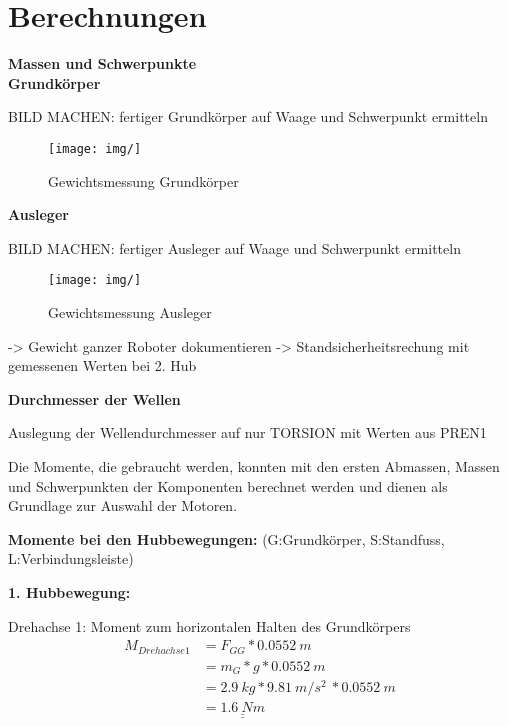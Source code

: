 \section{Berechnungen}

\textbf{Massen und Schwerpunkte}\\

\textbf{Grundkörper}

BILD MACHEN: fertiger Grundkörper auf Waage und Schwerpunkt ermitteln

\begin{figure}[H]
  \texttt{[image: img/]}
  \centering
  \caption{Gewichtsmessung Grundkörper}
\end{figure}

\newpage

\textbf{Ausleger}

BILD MACHEN: fertiger Ausleger auf Waage und Schwerpunkt ermitteln


\begin{figure}[H]
  \texttt{[image: img/]}
  \centering
  \caption{Gewichtsmessung Ausleger}
\end{figure}

-> Gewicht ganzer Roboter dokumentieren
-> Standsicherheitsrechung mit gemessenen Werten bei 2. Hub

\newpage

\textbf{Durchmesser der Wellen}

Auslegung der Wellendurchmesser auf nur TORSION mit Werten aus PREN1








Die Momente, die gebraucht werden, konnten mit den ersten Abmassen, Massen und Schwerpunkten der Komponenten berechnet werden und dienen als Grundlage zur Auswahl der Motoren.

\textbf{Momente bei den Hubbewegungen:} (G:Grundkörper, S:Standfuss, L:Verbindungsleiste)

\textbf{1. Hubbewegung:}

Drehachse 1: Moment zum horizontalen Halten des Grundkörpers
\begin{align*}
    M_{Drehachse 1} &= F_{GG} * 0.0552\ m \\
    &= m_{G} * g * 0.0552\ m \\
    &= 2.9\ kg * 9.81\ m/s^2\ * 0.0552\ m \\
    &= \underline{\underline{1.6\ Nm}}
\end{align*}

